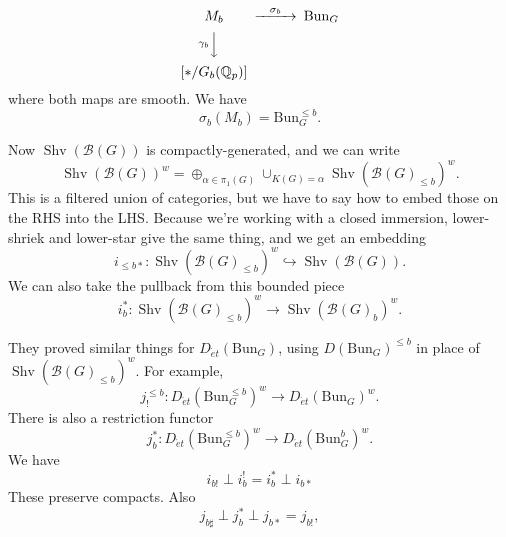 \documentclass[reqno]{amsart} 
\begin{document}
\begin{equation*}
  \begin{CD}         
    M_b @>\sigma_b>> \mathrm{Bun}_G\\
    @V \gamma_bVV  @. \\
    [\ast / G_b(\mathbb{Q}_p)] @.\\
  \end{CD}
\end{equation*}
where both maps are smooth.  We have
\begin{equation*}
  \sigma_b(M_b) = \mathrm{Bun}_G^{\leq b}.
\end{equation*}

Now $\operatorname{Shv}(\mathcal{B}(G))$ is compactly-generated, and we can write
\begin{equation*}
  \operatorname{Shv}(\mathcal{B}(G))^w = \oplus_{\alpha \in \pi_1(G)}
  \cup_{K(G) = \alpha} \operatorname{Shv}(\mathcal{B}(G)_{\leq b})^w.
\end{equation*}
This is a filtered union of categories, but we have to say how to embed those on the RHS into the LHS.  Because we're working with a closed immersion, lower-shriek and lower-star give the same thing, and we get an embedding
\begin{equation*}
  i_{\leq b \ast} : \operatorname{Shv}(\mathcal{B}(G)_{\leq b})^{w}
  \hookrightarrow \operatorname{Shv}(\mathcal{B}(G)).
\end{equation*}
We can also take the pullback from this bounded piece
\begin{equation*}
  i_{b}^{\ast} : \operatorname{Shv}(\mathcal{B}(G)_{\leq b})^w \rightarrow
  \operatorname{Shv}(\mathcal{B}(G)_b)^w.
\end{equation*}

They proved similar things for $D_{\acute{e}t}(\mathrm{Bun}_G)$, using $D(\mathrm{Bun}_G)^{\leq b}$ in place of $\operatorname{Shv}(\mathcal{B}(G)_{\leq b})^w$.  For example,
\begin{equation*}
  j _!^{\leq b} : D_{\acute{e}t} \left( \mathrm{Bun}_G^{\leq b} \right)^w \rightarrow D_{\acute{e}t}(\mathrm{Bun}_G)^w.
\end{equation*}
There is also a restriction functor
\begin{equation*}
  j_b^{\ast} : D_{\acute{e}t}(\mathrm{Bun}_G^{\leq b})^w \rightarrow
  D_{\acute{e}t}(\mathrm{Bun}_G^b)^w.
\end{equation*}
We have
\begin{equation*}
  i_{b !} \perp i_{b}^{!} = i_{b}^{\ast} \perp i_{b \ast}
\end{equation*}
These preserve compacts.  Also
\begin{equation*}
  j_{b \sharp} \perp j_b^{\ast} \perp j_{b \ast} = j_{b !},
\end{equation*}
\end{document}
